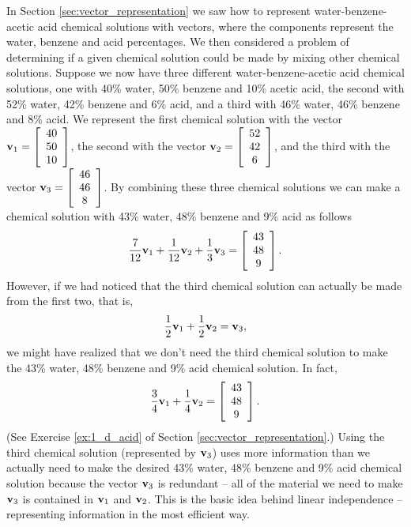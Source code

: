
In Section \ref{sec:vector_representation} we saw how to represent water-benzene-acetic acid chemical solutions with vectors, where the components represent the water, benzene and acid percentages.  We then considered a problem of determining if a given chemical solution could be made by mixing other chemical solutions. Suppose we now have three different water-benzene-acetic acid chemical solutions, one with 40\% water, 50\% benzene and 10\% acetic acid, the second with 52\% water, 42\% benzene and 6\% acid, and a third with 46\% water, 46\% benzene and 8\% acid. We represent the first chemical solution with the vector $\mathbf{v}_1 = \left[ \begin{array}{c} 40\\50\\10\end{array} \right]$, the second with the vector $\mathbf{v}_2 = \left[ \begin{array}{c} 52\\42\\6\end{array} \right]$, and the third with the vector $\mathbf{v}_3 = \left[ \begin{array}{c} 46\\46\\8\end{array} \right]$. By combining these three chemical solutions we can make a chemical solution with 43\% water, 48\% benzene and 9\% acid as follows
\[\frac{7}{12}\mathbf{v}_1 + \frac{1}{12} \mathbf{v}_2 + \frac{1}{3}\mathbf{v}_3 = \left[ \begin{array}{c} 43\\48\\9\end{array} \right].\]
However, if we had noticed that the third chemical solution can actually be made from the first two, that is,
\[\frac{1}{2}\mathbf{v}_1 + \frac{1}{2} \mathbf{v}_2 = \mathbf{v}_3,\]
we might have realized that we don't need the third chemical solution to make the 43\% water, 48\% benzene and 9\% acid chemical solution. In fact, 
\[\frac{3}{4}\mathbf{v}_1 + \frac{1}{4} \mathbf{v}_2 = \left[ \begin{array}{c} 43\\48\\9\end{array} \right].\]
(See Exercise \ref{ex:1_d_acid} of Section \ref{sec:vector_representation}.) Using the third chemical solution (represented by $\mathbf{v}_3$) uses more information than we actually need to make the desired 43\% water, 48\% benzene and 9\% acid chemical solution because the vector $\mathbf{v}_3$ is redundant -- all of the material we need to make $\mathbf{v}_3$ is contained in $\mathbf{v}_1$ and $\mathbf{v}_2$. This is the basic idea behind linear independence -- representing information in the most efficient way.

